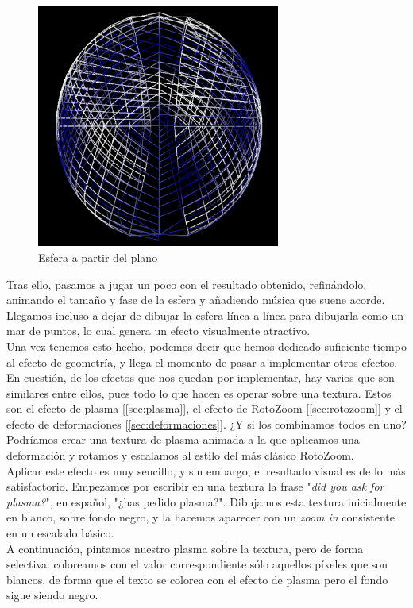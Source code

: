 \begin{figure}[h]
	\centering
	\includegraphics[width=8cm]{archivos/finalSphere}
	\caption{Esfera a partir del plano}
	\label{fig:finalSphere}
\end{figure}

Tras ello, pasamos a jugar un poco con el resultado obtenido, refinándolo, animando el tamaño y fase de la esfera y añadiendo música que suene acorde. Llegamos incluso a dejar de dibujar la esfera línea a línea para dibujarla como un mar de puntos, lo cual genera un efecto visualmente atractivo.\\

Una vez tenemos esto hecho, podemos decir que hemos dedicado suficiente tiempo al efecto de geometría, y llega el momento de pasar a implementar otros efectos. En cuestión, de los efectos que nos quedan por implementar, hay varios que son similares entre ellos, pues todo lo que hacen es operar sobre una textura. Estos son el efecto de plasma [\ref{sec:plasma}], el efecto de RotoZoom [\ref{sec:rotozoom}] y el efecto de deformaciones [\ref{sec:deformaciones}]. ¿Y si los combinamos todos en uno? Podríamos crear una textura de plasma animada a la que aplicamos una deformación y rotamos y escalamos al estilo del más clásico RotoZoom.\\

Aplicar este efecto es muy sencillo, y sin embargo, el resultado visual es de lo más satisfactorio. Empezamos por escribir en una textura la frase "\emph{did you ask for plasma?}", en español, "¿has pedido plasma?". Dibujamos esta textura inicialmente en blanco, sobre fondo negro, y la hacemos aparecer con un \emph{zoom in} consistente en un escalado básico.\\

A continuación, pintamos nuestro plasma sobre la textura, pero de forma selectiva: coloreamos con el valor correspondiente sólo aquellos píxeles que son blancos, de forma que el texto se colorea con el efecto de plasma pero el fondo sigue siendo negro.\\

